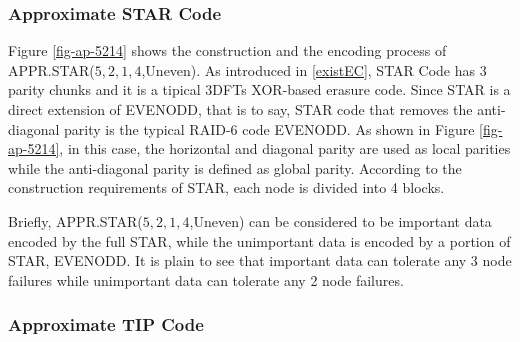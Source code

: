 \documentclass[sigconf]{acmart}
\begin{document}
\subsubsection{Approximate STAR Code}
Figure \ref{fig-ap-5214} shows the construction and the encoding process of APPR.STAR($5,2,1,4$,Uneven).
As introduced in \ref{existEC}, STAR Code \cite{STAR} has 3 parity chunks and it is a tipical 3DFTs XOR-based erasure code.
Since STAR is a direct extension of EVENODD\cite{EVENODD}, that is to say, STAR code that removes the anti-diagonal parity is the typical RAID-6 code EVENODD. As shown in Figure \ref{fig-ap-5214}, in this case, the horizontal and diagonal parity are used as local parities while the anti-diagonal parity is defined as global parity.
According to the construction requirements of STAR, each node is divided into 4 blocks.

Briefly, APPR.STAR($5,2,1,4$,Uneven) can be considered to be important data encoded by the full STAR, while the unimportant data is encoded by a portion of STAR, EVENODD. It is plain to see that important data can tolerate any 3 node failures while unimportant data can tolerate any 2 node failures.

\subsubsection{Approximate TIP Code}
\end{document}
